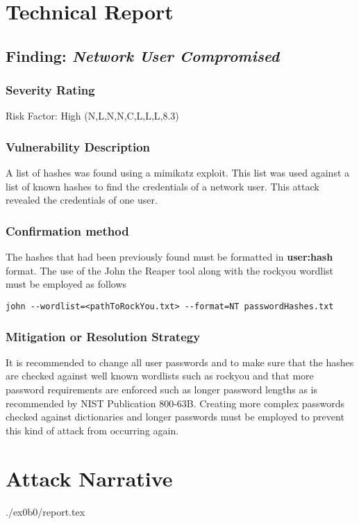 \section{Technical Report}

  \subsection{Finding: \emph{Network User Compromised}}
	\subsubsection*{Severity Rating}
	Risk Factor: High
    \cvss(N,L,N,N,C,L,L,L,8.3)
		
  	\subsubsection*{Vulnerability Description}
  		A list of hashes was found using a mimikatz exploit. This list was used against
        a list of known hashes to find the credentials of a network user. This attack revealed
        the credentials of one user. 

  	\subsubsection*{Confirmation method}
  	The hashes that had been previously found must be formatted in \textbf{user:hash} format. The use
    of the John the Reaper tool along with the rockyou wordlist must be employed as follows
    \begin{verbatim}
john --wordlist=<pathToRockYou.txt> --format=NT passwordHashes.txt
    \end{verbatim}
    
    \subsubsection*{Mitigation or Resolution Strategy}
    It is recommended to change all user passwords and to make sure that the hashes are checked against
    well known wordlists such as rockyou and that more password requirements are enforced such as longer password
    lengths as is recommended by NIST Publication 800-63B. Creating more complex passwords checked against
    dictionaries and longer passwords must be employed to prevent this kind of attack from occurring again.



\section{Attack Narrative}
./ex0b0/report.tex

